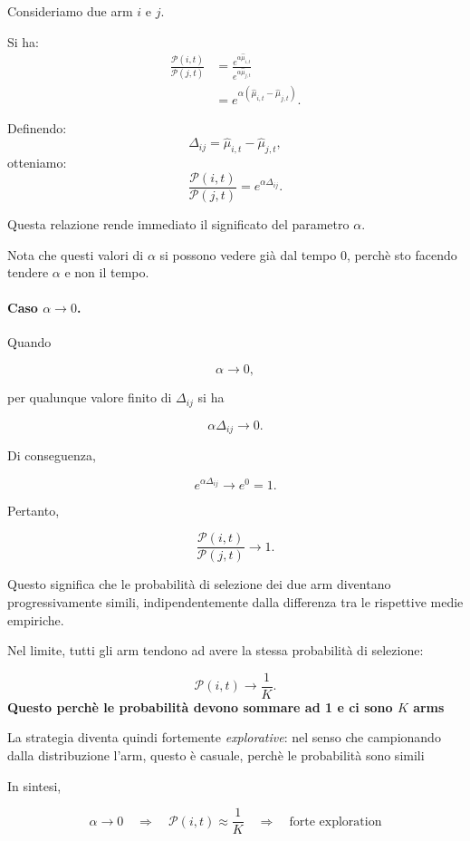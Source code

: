 Consideriamo due arm $i$ e $j$.

Si ha:
\begin{align*}
\frac{\mathcal{P}(i,t)}
{\mathcal{P}(j,t)}
&=
\frac{
e^{\alpha\widehat{\mu}_{i,t}}
}{
e^{\alpha\widehat{\mu}_{j,t}}
}\\
&=
e^{\alpha
(\widehat{\mu}_{i,t}-\widehat{\mu}_{j,t})}.
\end{align*}

Definendo:
\[
\Delta_{ij}
=
\widehat{\mu}_{i,t}
-
\widehat{\mu}_{j,t},
\]
otteniamo:
\[
\frac{\mathcal{P}(i,t)}
{\mathcal{P}(j,t)}
=
e^{\alpha\Delta_{ij}}.
\]

Questa relazione rende immediato il significato del parametro $\alpha$.

\begin{warning}{}
    Nota che questi valori di $\alpha$ si possono vedere già dal tempo 0, perchè sto facendo tendere $\alpha$ e non il tempo.
\end{warning}

\paragraph{Caso $\alpha \to 0$.}

Quando

\[
\alpha \to 0,
\]

per qualunque valore finito di $\Delta_{ij}$ si ha

\[
\alpha\Delta_{ij}\to 0.
\]

Di conseguenza,

\[
e^{\alpha\Delta_{ij}}
\to
e^0
=
1.
\]

Pertanto,

\[
\frac{\mathcal{P}(i,t)}{\mathcal{P}(j,t)}
\to 1.
\]

Questo significa che le probabilità di selezione dei due arm diventano progressivamente simili, indipendentemente dalla differenza tra le rispettive medie empiriche.

Nel limite, tutti gli arm tendono ad avere la stessa probabilità di selezione:

\[
\mathcal{P}(i,t)
\to
\frac{1}{K}.
\]
\textbf{Questo perchè le probabilità devono sommare ad 1 e ci sono $K$ arms}

La strategia diventa quindi fortemente \emph{explorative}: nel senso che campionando dalla distribuzione l'arm, questo è casuale, perchè le probabilità sono simili

In sintesi,

\[
\boxed{
\alpha\to0
\quad\Longrightarrow\quad
\mathcal{P}(i,t)\approx\frac{1}{K}
\quad\Longrightarrow\quad
\text{forte exploration}
}
\]

